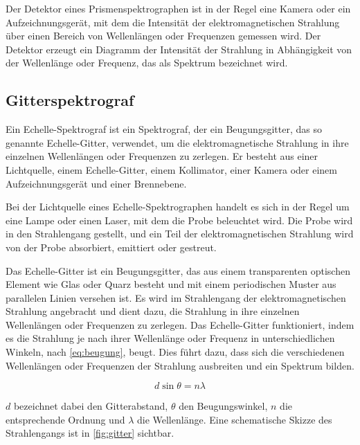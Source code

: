 \documentclass[12pt,english,ngerman]{scrartcl}
\begin{document}
Der Detektor eines Prismenspektrographen ist in der Regel eine Kamera oder ein
Aufzeichnungsgerät, mit dem die Intensität der elektromagnetischen Strahlung
über einen Bereich von Wellenlängen oder Frequenzen gemessen wird. Der Detektor
erzeugt ein Diagramm der Intensität der Strahlung in Abhängigkeit von der
Wellenlänge oder Frequenz, das als Spektrum bezeichnet wird.

\subsection{Gitterspektrograf}

Ein Echelle-Spektrograf ist ein Spektrograf, der ein Beugungsgitter, das so
genannte Echelle-Gitter, verwendet, um die elektromagnetische Strahlung in ihre
einzelnen Wellenlängen oder Frequenzen zu zerlegen. Er besteht aus einer
Lichtquelle, einem Echelle-Gitter, einem Kollimator, einer Kamera oder einem
Aufzeichnungsgerät und einer Brennebene.

Bei der Lichtquelle eines Echelle-Spektrographen handelt es sich in der Regel
um eine Lampe oder einen Laser, mit dem die Probe beleuchtet wird. Die Probe
wird in den Strahlengang gestellt, und ein Teil der elektromagnetischen
Strahlung wird von der Probe absorbiert, emittiert oder gestreut.

Das Echelle-Gitter ist ein Beugungsgitter, das aus einem transparenten
optischen Element wie Glas oder Quarz besteht und mit einem periodischen Muster
aus parallelen Linien versehen ist. Es wird im Strahlengang der
elektromagnetischen Strahlung angebracht und dient dazu, die Strahlung in ihre
einzelnen Wellenlängen oder Frequenzen zu zerlegen. Das Echelle-Gitter
funktioniert, indem es die Strahlung je nach ihrer Wellenlänge oder Frequenz in
unterschiedlichen Winkeln, nach \autoref{eq:beugung}, beugt. Dies führt dazu,
dass sich die verschiedenen Wellenlängen oder Frequenzen der Strahlung
ausbreiten und ein Spektrum bilden.

\begin{equation}
	d \sin{\theta} = n \lambda
	\label{eq:beugung}
\end{equation}

$d$ bezeichnet dabei den Gitterabstand, $\theta$ den Beugungswinkel, $n$ die entsprechende Ordnung und $\lambda$ die Wellenlänge.
Eine schematische Skizze des Strahlengangs ist in \autoref{fig:gitter} sichtbar.
\end{document}
